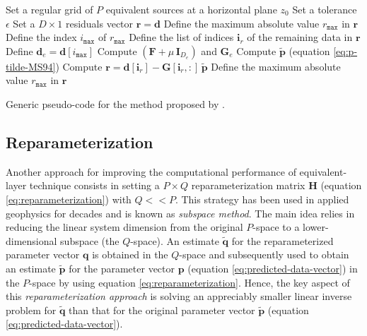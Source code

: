 \begin{algorithm}
	\Input{}
	Set a regular grid of $P$ equivalent sources at a horizontal plane $z_{0}$ \;
	Set a tolerance $\epsilon$ \;
	Set a $D \times 1$ residuals vector $\mathbf{r} = \mathbf{d}$ \;
	Define the maximum absolute value $r_{\mathtt{max}}$ in $\mathbf{r}$ \; 
	Define the index $i_{\mathtt{max}}$ of $r_{\mathtt{max}}$ \;
	Define the list of indices $\mathbf{i}_{r}$ of the remaining data in $\mathbf{r}$ \;
	Define $\mathbf{d}_{e} = \mathbf{d}[i_{\mathtt{max}}] $ \;
	Compute $\left(\mathbf{F} + \mu \, \mathbf{I}_{D_{e}} \right)$ and $\mathbf{G}_{e}$ \;
	Compute $\tilde{\mathbf{p}}$ (equation \ref{eq:p-tilde-MS94}) \;
	Compute $\mathbf{r} = \mathbf{d}[\mathbf{i}_{r}] - \mathbf{G}[\mathbf{i}_{r}, :] \, \tilde{\mathbf{p}}$ \;
	Define the maximum absolute value $r_{\mathtt{max}}$ in $\mathbf{r}$ \; 
	\caption{Generic pseudo-code for the method proposed by \cite{mendonca-silva1994}.}
	\label{alg:MS94}
\end{algorithm}

\subsection{Reparameterization}

Another approach for improving the computational performance of equivalent-layer technique consists in 
setting a $P \times Q$ reparameterization matrix $\mathbf{H}$ (equation \ref{eq:reparameterization})
with $Q << P$. 
This strategy has been used in applied geophysics for decades \cite[e.g.,][]{skilling-bryan1984, kennett1988, oldenburg1993, barbosa-etal1997} 
and is known as \textit{subspace method}. 
The main idea relies in reducing the linear system dimension from the original $P$-space to a lower-dimensional subspace (the $Q$-space).
An estimate $\tilde{\mathbf{q}}$ for the reparameterized parameter vector $\mathbf{q}$
is obtained in the $Q$-space and subsequently used to obtain an estimate $\tilde{\mathbf{p}}$ 
for the parameter vector $\mathbf{p}$ (equation \ref{eq:predicted-data-vector}) in the $P$-space by using equation
\ref{eq:reparameterization}. 
Hence, the key aspect of this \textit{reparameterization approach} is solving an appreciably smaller linear inverse problem for 
$\tilde{\mathbf{q}}$ than that for the original parameter vector $\tilde{\mathbf{p}}$ (equation \ref{eq:predicted-data-vector}).

